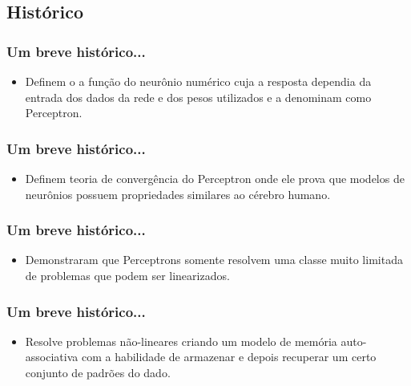 \documentclass[aspectratio=10]{beamer} %
\begin{document}
\subsection{Histórico}

\begin{frame}
\frametitle{Um breve histórico...}
\pause
\begin{small}
\end{small}
\begin{itemize}
\item Definem o a função do neurônio numérico cuja a resposta dependia da entrada dos dados da rede e dos pesos utilizados e a denominam como Perceptron.
\end{itemize}	
\end{frame}


\begin{frame}
\frametitle{Um breve histórico...}
\begin{small}
\end{small}
\begin{itemize}
\item Definem teoria de convergência do Perceptron onde ele prova que modelos de neurônios possuem propriedades similares ao cérebro humano.
\end{itemize}
\end{frame}

\begin{frame}
\frametitle{Um breve histórico...}
\begin{small}
\end{small}
\begin{itemize}
\item Demonstraram que Perceptrons somente resolvem uma classe muito limitada de problemas que podem ser linearizados.
\end{itemize}
\end{frame}

\begin{frame}
\frametitle{Um breve histórico...}
\begin{small}
\end{small}
\begin{itemize}
\item Resolve problemas não-lineares criando um  modelo de memória auto-associativa com a habilidade de armazenar e depois recuperar um certo conjunto de padrões do dado.  
\end{itemize}
\end{frame}
\end{document}
